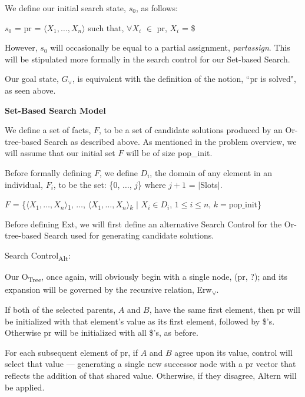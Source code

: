 \documentclass[11pt, oneside]{article}   	%
\newenvironment{cmr}{\fontfamily{cmr}\selectfont}{\par}
\begin{document}
\noindent We define our initial search state, $s_0$, as follows:

\noindent \centerline{$s_0$ = pr = $\langle X_1, \dots, X_n\rangle$ such that, $\forall X_i$ $\in$ pr, $X_i$ = \$}

\noindent However, $s_0$ will occasionally be equal to a partial assignment, \textit{partassign}. This will be stipulated more formally in the search control for our Set-based Search.

\noindent Our goal state, $G_{\lor}$, is equivalent with the definition of the notion, ``pr is solved", as seen above.\\
\newpage

\noindent \textbf{Set-Based Search Model}

\begin{cmr}
\noindent We define a set of facts, $F$, to be a set of candidate solutions produced by an Or-tree-based Search as described above.
As mentioned in the problem overview, we will assume that our initial set $F$ will be of size pop_init.
\end{cmr}

\noindent Before formally defining $F$, we define $D_i$, the domain of any element in an individual, $F_i$, to be the set: \{0, $\dots$, $j$\} where $j+1$ = $\vert$Slots$\vert$.

\noindent \centerline{$F$ = \{$\langle X_1, \dots, X_n\rangle$\textsubscript{$1$}, $\dots$, $\langle X_1, \dots, X_n\rangle$\textsubscript{$k$} $\vert$ $X_i \in D_i$, $1 \le i \le n$, $k = \text{pop_init}$\}}

\noindent Before defining Ext, we will first define an alternative Search Control for the Or-tree-based Search used for generating candidate solutions.

\noindent Search Control\textsubscript{Alt}:

\noindent Our O\textsubscript{Tree}, once again, will obviously begin with a single node, (pr, ?); and its expansion will be governed by the recursive relation, Erw\textsubscript{$\lor$}.

\noindent If both of the selected parents, $A$ and $B$, have the same first element, then pr will be initialized with that element's value as its first element, followed by \$'s. Otherwise pr will be initialized with all \$'s, as before.

\noindent For each subsequent element of pr, if $A$ and $B$ agree upon its value, control will select that value --- generating a single new successor node with a pr vector that reflects the addition of that shared value. Otherwise, if they disagree, Altern will be applied.
\end{document}
